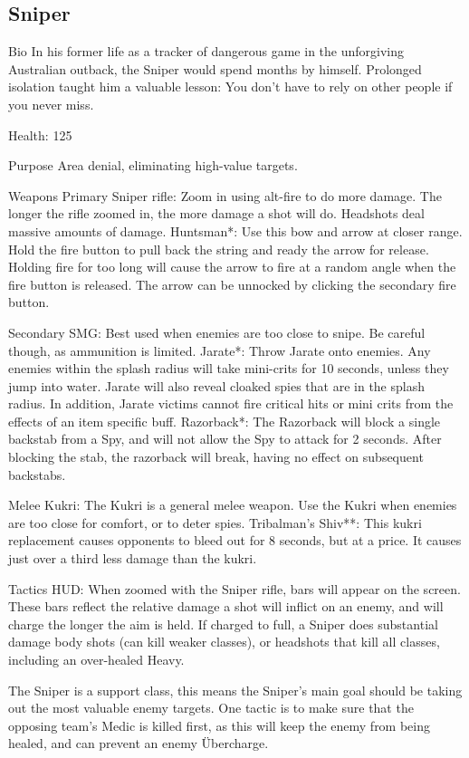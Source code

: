 \subsection{Sniper}
Bio
In his former life as a tracker of dangerous game in the unforgiving Australian outback, the Sniper would spend months by himself. Prolonged isolation taught him a valuable lesson: You don't have to rely on other people if you never miss.

Health: 125

Purpose
Area denial, eliminating high-value targets.

Weapons
Primary
Sniper rifle: Zoom in using alt-fire to do more damage. The longer the rifle zoomed in, the more damage a shot will do. Headshots deal massive amounts of damage.
Huntsman*: Use this bow and arrow at closer range. Hold the fire button to pull back the string and ready the arrow for release. Holding fire for too long will cause the arrow to fire at a random angle when the fire button is released. The arrow can be unnocked by clicking the secondary fire button.

Secondary
SMG: Best used when enemies are too close to snipe. Be careful though, as ammunition is limited.
Jarate*: Throw Jarate onto enemies. Any enemies within the splash radius will take mini-crits for 10 seconds, unless they jump into water. Jarate will also reveal cloaked spies that are in the splash radius. In addition, Jarate victims cannot fire critical hits or mini crits from the effects of an item specific buff.
Razorback*: The Razorback will block a single backstab from a Spy, and will not allow the Spy to attack for 2 seconds. After blocking the stab, the razorback will break, having no effect on subsequent backstabs.

Melee
Kukri: The Kukri is a general melee weapon. Use the Kukri when enemies are too close for comfort, or to deter spies.
Tribalman's Shiv**: This kukri replacement causes opponents to bleed out for 8 seconds, but at a price. It causes just over a third less damage than the kukri.

Tactics
HUD: When zoomed with the Sniper rifle, bars will appear on the screen. These bars reflect the relative damage a shot will inflict on an enemy, and will charge the longer the aim is held. If charged to full, a Sniper does substantial damage body shots (can kill weaker classes), or headshots that kill all classes, including an over-healed Heavy.

The Sniper is a support class, this means the Sniper's main goal should be taking out the most valuable enemy targets. One tactic is to make sure that the opposing team's Medic is killed first, as this will keep the enemy from being healed, and can prevent an enemy Übercharge.

